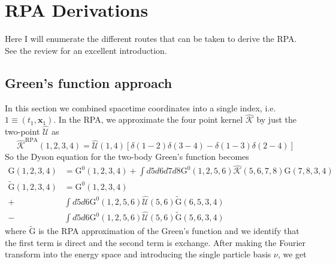 \section{RPA Derivations}
Here I will enumerate the different routes that can be taken to derive the RPA. See the review \cite{co2023introducing} for an excellent introduction.
\subsection{Green's function approach}
In this section we combined spacetime coordinates into a single index, i.e. $1 \equiv (t_1, \mathbf{x}_1)$.
In the RPA, we approximate the four point kernel $\hat{\mathcal{K}}$ by just the two-point $\hat{\mathcal{U}}$ as
\begin{equation}
\hat{\mathcal{K}}^{\mathrm{RPA}}\left( 1, 2, 3, 4\right)=\hat{\mathcal{U}}\left(1, 4\right)\left[\delta\left(1-2\right) \delta\left(3-4\right)-\delta\left(1-3\right) \delta\left(2-4\right)\right]
\end{equation}
So the Dyson equation for the two-body Green's function becomes
\begin{align}
    \mathrm{G}\left(1, 2, 3, 4\right)&=\mathrm{G}^0\left(1, 2, 3, 4\right) + \int d5 d6 d7 d8 \mathrm{G}^0\left(1, 2, 5, 6\right) \hat{\mathcal{K}}\left(5, 6, 7, 8\right) \mathrm{G}\left(7, 8, 3, 4\right)\\
\tilde{\mathrm{G}}\left(1, 2, 3, 4\right) &=\mathrm{G}^0\left(1, 2, 3, 4\right)\\
+ & \int d5 d6 \mathrm{G}^0\left(1, 2, 5, 6\right) \hat{\mathcal{U}}\left(5, 6\right) \tilde{\mathrm{G}}\left(6, 5, 3, 4\right)\\
- & \int d5 d6 \mathrm{G}^0\left(1, 2, 5, 6\right) \hat{\mathcal{U}}\left(5, 6\right) \tilde{\mathrm{G}}\left(5, 6, 3, 4\right)
\end{align}
where $\tilde{\mathrm{G}}$ is the RPA approximation of the Green's function and we identify that the first term is direct and the second term is exchange. After making the Fourier transform into the energy space and introducing the single particle basis $\nu$, we get
